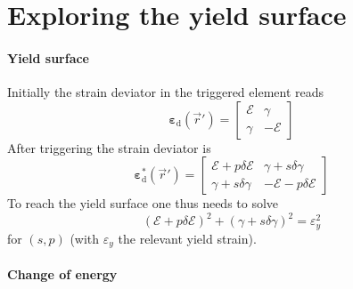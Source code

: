 \documentclass[fleqn]{goose-article}
\begin{document}
\clearpage

\section*{Exploring the yield surface}

\paragraph{Yield surface}

Initially the strain deviator in the triggered element reads
\begin{equation}
    \bm{\varepsilon}_\mathrm{d}(\vec{r}') =
    \begin{bmatrix}
        \mathcal{E} & \gamma \\
        \gamma & - \mathcal{E}
    \end{bmatrix}
\end{equation}
After triggering the strain deviator is
\begin{equation}
    \bm{\varepsilon}_\mathrm{d}^*(\vec{r}') =
    \begin{bmatrix}
        \mathcal{E} + p \delta \mathcal{E} & \gamma + s \delta \gamma \\
        \gamma + s \delta \gamma & - \mathcal{E} - p \delta \mathcal{E}
    \end{bmatrix}
\end{equation}
To reach the yield surface one thus needs to solve
\begin{equation}
    (\mathcal{E} + p \delta \mathcal{E})^2 +
    (\gamma + s \delta \gamma)^2 =
    \varepsilon_y^2
\end{equation}
for $(s, p)$ (with $\varepsilon_y$ the relevant yield strain).

\paragraph{Change of energy}
\end{document}
